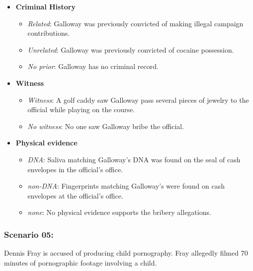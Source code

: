 \documentclass[
]{article}
\providecommand{\tightlist}{%
  \setlength{\itemsep}{0pt}\setlength{\parskip}{0pt}}
\begin{document}
\begin{itemize}
\tightlist
\item
  \textbf{Criminal History}

  \begin{itemize}
  \tightlist
  \item
    \emph{Related}: Galloway was previously convicted of making illegal
    campaign contributions.
  \item
    \emph{Unrelated}: Galloway was previously convicted of cocaine
    possession.
  \item
    \emph{No prior}: Galloway has no criminal record.
  \end{itemize}
\item
  \textbf{Witness}

  \begin{itemize}
  \tightlist
  \item
    \emph{Witness}: A golf caddy saw Galloway pass several pieces of
    jewelry to the official while playing on the course.
  \item
    \emph{No witness}: No one saw Galloway bribe the official.
  \end{itemize}
\item
  \textbf{Physical evidence}

  \begin{itemize}
  \tightlist
  \item
    \emph{DNA}: Saliva matching Galloway's DNA was found on the seal of
    cash envelopes in the official's office.
  \item
    \emph{non-DNA}: Fingerprints matching Galloway's were found on cash
    envelopes at the official's office.
  \item
    \emph{none}: No physical evidence supports the bribery allegations.
  \end{itemize}
\end{itemize}

\hypertarget{scenario-05}{%
\subsubsection{Scenario 05:}\label{scenario-05}}

Dennis Fray is accused of producing child pornography. Fray allegedly
filmed 70 minutes of pornographic footage involving a child.
\end{document}
